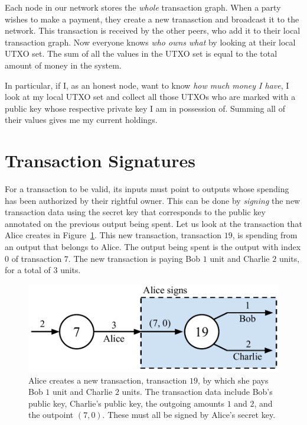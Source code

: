 Each node in our network stores the \emph{whole} transaction graph. When a party wishes to make
a payment, they create a new tranasction and broadcast it to the network. This transaction is
received by the other peers, who add it to their local transaction graph. Now everyone
knows \emph{who owns what} by looking at their local UTXO set. The sum of all the values
in the UTXO set is equal to the total amount of money in the system.

In particular, if I, as an honest node, want to know \emph{how much money I have}, I look
at my local UTXO set and collect all those UTXOs who are marked with a public key whose
respective private key I am in possession of. Summing all of their values gives me my
current holdings.

\section{Transaction Signatures}

For a transaction to be valid, its inputs must point to outputs whose spending has
been authorized by their rightful owner. This can be done by \emph{signing} the new transaction
data using the secret key that corresponds to the public key annotated on the previous output
being spent.
Let us look at the transaction that Alice creates in Figure~\ref{fig.utxo-sig}. This
new transaction, transaction $19$, is spending from an output that belongs to Alice.
The output being spent is the output with index $0$ of transaction $7$.
The new transaction is paying Bob $1$ unit and Charlie $2$ units, for a total of
$3$ units.

\begin{figure}[h]
  \centering
  \includegraphics[width=0.65 \columnwidth,keepaspectratio]{figures/utxo-sig.pdf}
  \caption{Alice creates a new transaction, transaction $19$, by which she pays Bob
           $1$ unit
           and Charlie $2$ units.
           The transaction data include Bob's public key, Charlie's public key,
           the outgoing amounts $1$ and $2$, and the outpoint $(7, 0)$.
           These must all be signed by Alice's secret key.}
  \label{fig.utxo-sig}
\end{figure}


